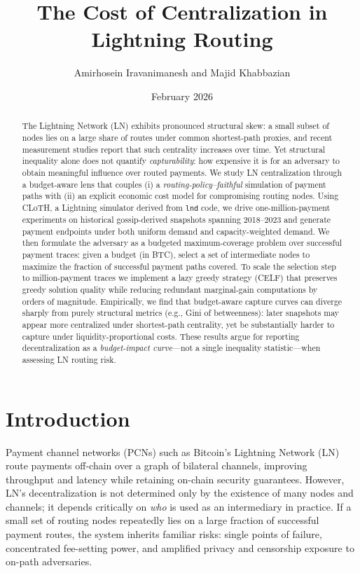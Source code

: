 \documentclass{article}
\title{The Cost of Centralization in Lightning Routing}
\author{Amirhosein Iravanimanesh and Majid Khabbazian}
\date{February 2026}
\begin{document}
\maketitle

\begin{abstract}
The Lightning Network (LN) exhibits pronounced structural skew: a small subset of nodes lies on a large share of routes under common shortest-path proxies, and recent measurement studies report that such centrality increases over time.  Yet structural inequality alone does not quantify \emph{capturability}: how expensive it is for an adversary to obtain meaningful influence over routed payments.
We study LN centralization through a budget-aware lens that couples (i) a \emph{routing-policy--faithful} simulation of payment paths with (ii) an explicit economic cost model for compromising routing nodes.
Using CLoTH, a Lightning simulator derived from \texttt{lnd} code, we drive one-million-payment experiments on historical gossip-derived snapshots spanning 2018--2023 and generate payment endpoints under both uniform demand and capacity-weighted demand.
We then formulate the adversary as a budgeted maximum-coverage problem over successful payment traces: given a budget (in BTC), select a set of intermediate nodes to maximize the fraction of successful payment paths covered.
To scale the selection step to million-payment traces we implement a lazy greedy strategy (CELF) that preserves greedy solution quality while reducing redundant marginal-gain computations by orders of magnitude.
Empirically, we find that budget-aware capture curves can diverge sharply from purely structural metrics (e.g., Gini of betweenness): later snapshots may appear more centralized under shortest-path centrality, yet be substantially harder to capture under liquidity-proportional costs.
These results argue for reporting decentralization as a \emph{budget-impact curve}---not a single inequality statistic---when assessing LN routing risk.
\end{abstract}

\section{Introduction}

Payment channel networks (PCNs) such as Bitcoin's Lightning Network (LN) route payments off-chain over a graph of bilateral channels, improving throughput and latency while retaining on-chain security guarantees. However, LN's decentralization is not determined only by the existence of many nodes and channels; it depends critically on \emph{who} is used as an intermediary in practice. If a small set of routing nodes repeatedly lies on a large fraction of successful payment routes, the system inherits familiar risks: single points of failure, concentrated fee-setting power, and amplified privacy and censorship exposure to on-path adversaries.
\end{document}
